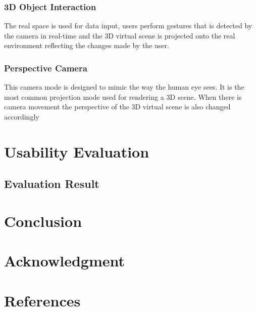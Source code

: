 \documentclass[conference]{IEEEtran}
\begin{document}
\subsubsection{3D Object Interaction}
The real space is used for data input, users perform gestures that is detected by the camera in real-time and the 3D virtual scene is projected onto the real environment reflecting the changes made by the user.

\subsubsection{Perspective Camera}
This camera mode is designed to mimic the way the human eye sees. It is the most common projection mode used for rendering a 3D scene. When there is camera movement the perspective of the 3D virtual scene is also changed accordingly
\section{Usability Evaluation}
\subsection{Evaluation Result}
\section{Conclusion}

\section*{Acknowledgment}

\section*{References}
\end{document}
